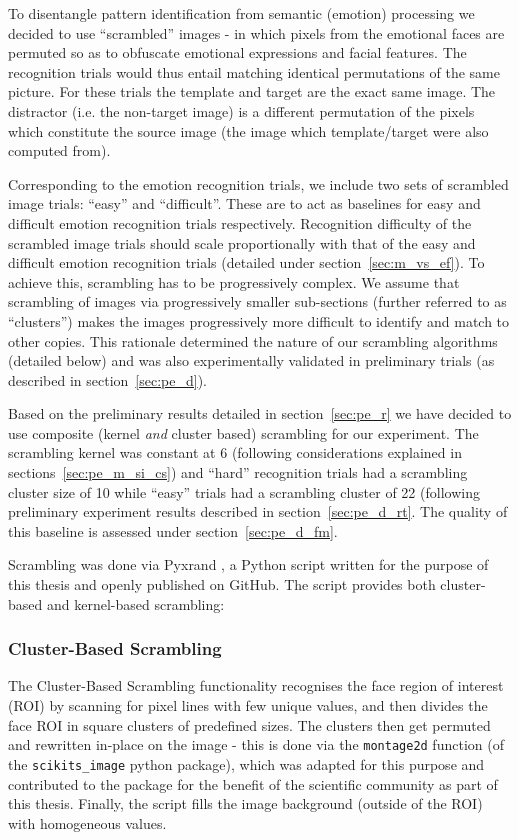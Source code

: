 	    To disentangle pattern identification from semantic (emotion) processing we decided to use “scrambled” images - in which pixels from the emotional faces are permuted so as to obfuscate emotional expressions and facial features.
	    The recognition trials would thus entail matching identical permutations of the same picture.
	    For these trials the template and target are the exact same image.
	    The distractor (i.e. the non-target image) is a different permutation of the pixels which constitute the source image (the image which template/target were also computed from). 
	    
	    Corresponding to the emotion recognition trials, we include two sets of scrambled image trials: “easy” and “difficult”.
	    These are to act as baselines for easy and difficult emotion recognition trials respectively.
	    Recognition difficulty of the scrambled image trials should scale proportionally with that of the easy and difficult emotion recognition trials (detailed under section~\ref{sec:m_vs_ef}).
	    To achieve this, scrambling has to be progressively complex.
	    We assume that scrambling of images via progressively smaller sub-sections (further referred to as “clusters”) makes the images progressively more difficult to identify and match to other copies.
	    This rationale determined the nature of our scrambling algorithms (detailed below) and was also experimentally validated in preliminary trials (as described in section~\ref{sec:pe_d}).
	    
	    Based on the preliminary results detailed in section~\ref{sec:pe_r} we have decided to use composite (kernel \textit{and} cluster based) scrambling for our experiment.
	    The scrambling kernel was constant at \SI{6}{\pixel} (following considerations explained in sections~\ref{sec:pe_m_si_cs}) 
	    and “hard” recognition trials had a scrambling cluster size of \SI{10}{\pixel} while “easy” trials had a scrambling cluster of \SI{22}{\pixel} (following preliminary experiment results described in section~\ref{sec:pe_d_rt}.
	    The quality of this baseline is assessed under section~\ref{sec:pe_d_fm}.
	    
	    Scrambling was done via Pyxrand \citep{pyxrand}, a Python script written for the purpose of this thesis and openly published on GitHub.
	    The script provides both cluster-based and kernel-based scrambling:
	    \subsubsection{Cluster-Based Scrambling}\label{sec:m_vs_si_cs}
		The Cluster-Based Scrambling functionality recognises the face region of interest (ROI) by scanning for pixel lines with few unique values, and then divides the face ROI in square clusters of predefined sizes.
		The clusters then get permuted and rewritten in-place on the image - this is done via the \colorbox{vlg}{\texttt{montage2d}} function (of the \colorbox{vlg}{\texttt{scikits\_image}} python package), which  was adapted for this purpose and contributed to the package for the benefit of the scientific community as part of this thesis.
		Finally, the script fills the image background (outside of the ROI) with homogeneous values.

